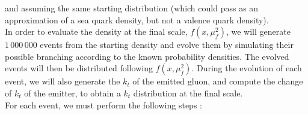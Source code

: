 \documentclass[a4paper,10pt]{report}
\begin{document}
    and assuming the same starting distribution (which could pass as an approximation of a sea quark 
    density, but not a valence quark density).\\

    In order to evaluate the density at the final scale, $f(x, \mu_f^2)$, we will generate $1\,000\,000$
    events from the starting density and evolve them by simulating their possible branching 
    according to the known probability densities. The evolved events will then be distributed 
    following $f(x, \mu_f^2)$. During the evolution of each event, we will also generate the 
    $k_t$ of the emitted gluon, and compute the change of $k_t$ of the emitter, to obtain a 
    $k_t$ distribution at the final scale. \\ 

    For each event, we must perform the following steps : 
\end{document}
